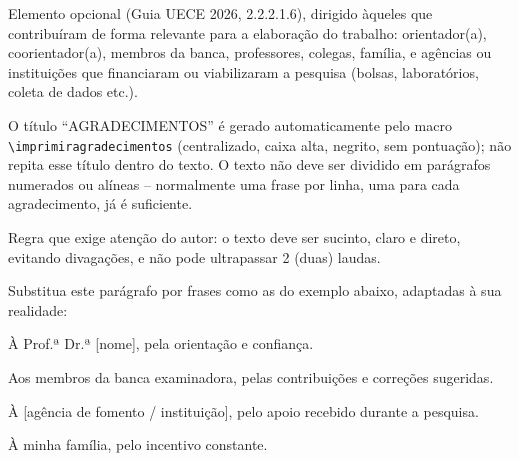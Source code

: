 Elemento opcional (Guia UECE 2026, 2.2.2.1.6), dirigido àqueles que contribuíram de forma relevante para a elaboração do trabalho: orientador(a), coorientador(a), membros da banca, professores, colegas, família, e agências ou instituições que financiaram ou viabilizaram a pesquisa (bolsas, laboratórios, coleta de dados etc.).

O título ``AGRADECIMENTOS'' é gerado automaticamente pelo macro \texttt{\textbackslash imprimiragradecimentos} (centralizado, caixa alta, negrito, sem pontuação); não repita esse título dentro do texto. O texto não deve ser dividido em parágrafos numerados ou alíneas -- normalmente uma frase por linha, uma para cada agradecimento, já é suficiente.

Regra que exige atenção do autor: o texto deve ser sucinto, claro e direto, evitando divagações, e não pode ultrapassar 2 (duas) laudas.

Substitua este parágrafo por frases como as do exemplo abaixo, adaptadas à sua realidade:

À Prof.ª Dr.ª [nome], pela orientação e confiança.

Aos membros da banca examinadora, pelas contribuições e correções sugeridas.

À [agência de fomento / instituição], pelo apoio recebido durante a pesquisa.

À minha família, pelo incentivo constante.
